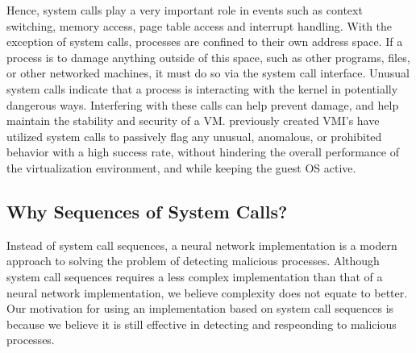 \documentclass{report}
\begin{document}
\begin{spacing}{1.5}
{Hence, system calls play a very important role in events such as context switching, memory access, page table access and interrupt handling. With the exception of system calls, processes are confined to their own address space. If a process is to damage anything outside of this space, such as other programs, files, or other networked machines, it must do so via the system call interface. Unusual system calls indicate that a process is interacting with the kernel in potentially dangerous ways. Interfering with these calls can help prevent damage, and help maintain the stability and security of a VM. previously created VMI's have utilized system calls to passively flag any unusual, anomalous, or prohibited behavior with a high success rate, without hindering the overall performance of the virtualization environment, and while keeping the guest OS active.
\newline
}




























































\subsection{Why Sequences of System Calls?}

Instead of system call sequences, a neural network implementation is a modern
approach to solving the problem of detecting malicious processes. Although system
call sequences requires a less complex implementation than that of a neural network
implementation, we believe complexity does not equate to better. Our motivation for
using an implementation based on system call sequences is because we believe it is
still effective in detecting and respeonding to malicious processes.


















\end{spacing}
\end{document}
